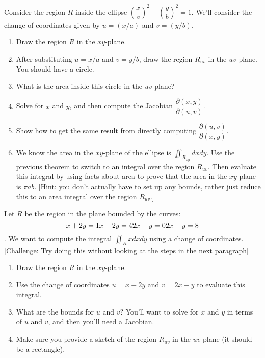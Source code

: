 \begin{problem}
 Consider the region $R$ inside the ellipse $\left(\dfrac{x}{a}\right)^2+\left(\dfrac{y}{b}\right)^2=1$.  We'll consider the change of coordinates given by $u=(x/a)$ and $v=(y/b)$.
\begin{enumerate}
	\item Draw the region $R$ in the $xy$-plane.  
	\item After substituting $u=x/a$ and $v=y/b$, draw the region $R_{uv}$ in the $uv$-plane.  You should have a circle.  
	\item What is the area inside this circle in the $uv$-plane?
	\item Solve for $x$ and $y$, and then compute the Jacobian  $\dfrac{\partial (x,y)}{\partial (u,v)}$. 
	\item Show how to get the same result from directly computing $\dfrac{\partial (u,v)}{\partial (x,y)}$.
	\item We know the area in the $xy$-plane of the ellipse is $\iint_{R_{xy}} dxdy$. Use the previous theorem to switch to an integral over the region $R_{uv}$.  Then evaluate this integral by using facts about area to prove that the area in the $xy$ plane is $\pi a b$. [Hint: you don't actually have to set up any bounds, rather just reduce this to an area integral over the region $R_{uv}$.] 
\end{enumerate}

\end{problem}


\begin{problem}
Let $R$ be the region in the plane bounded by the curves: $$x+2y=1\\x+2y=4\\2x-y=0\\2x-y=8$$.  We want to compute the integral $\iint_R xdxdy$ using a change of coordinates. [Challenge: Try doing this without looking at the steps in the next paragraph]\\

\begin{enumerate}
	\item Draw the region $R$ in the $xy$-plane. 
	\item Use the change of coordinates $u=x+2y$ and $v=2x-y$ to evaluate this integral. 
	\item What are the bounds for $u$ and $v$?  You'll want to solve for $x$ and $y$ in terms of $u$ and $v$, and then you'll need a Jacobian.
	\item Make sure you provide a sketch of the region $R_{uv}$ in the $uv$-plane (it should be a rectangle). 
\end{enumerate}
	
\end{problem}


